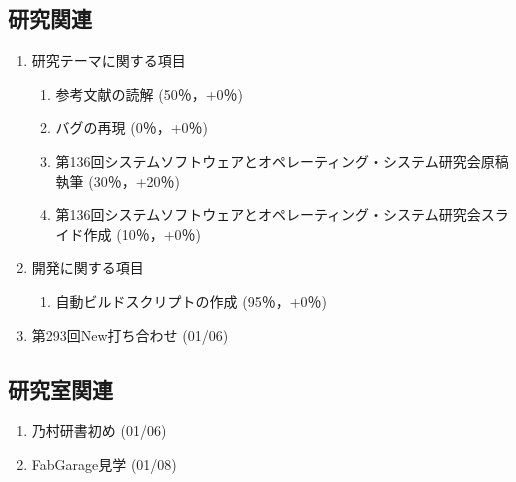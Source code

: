 \documentclass[fleqn, 14pt]{extarticle}
\begin{document}
    \subsection{研究関連}
    \label{sec-2-1}
    \begin{enumerate}

        \item 研究テーマに関する項目
            \hfill
            \label{enum-research1}
            \begin{enumerate}

                \item 参考文献の読解
                    \hfill
                    \label{enum-1-A}
                    (50％，+0％)

                \item バグの再現
                    \hfill
                    \label{enum-1-B}
                    (0％，+0％)

                \item 第136回システムソフトウェアとオペレーティング・システム研究会原稿執筆
                    \hfill
                    \label{enum-1-C}
                    (30％，+20％)

                \item 第136回システムソフトウェアとオペレーティング・システム研究会スライド作成
                    \hfill
                    \label{enum-1-D}
                    (10％，+0％)

            \end{enumerate}

        \item 開発に関する項目
            \hfill
            \label{enum-research2}
            \begin{enumerate}

                \item 自動ビルドスクリプトの作成
                    \hfill
                    \label{enum-2-A}
                    (95％，+0％)

            \end{enumerate}

        \item 第293回New打ち合わせ
            \hfill
            \label{enum-research3}
            (01/06)

    \end{enumerate}
    \subsection{研究室関連}
    \label{sec-2-2}
    \begin{enumerate}

        \item 乃村研書初め
            \hfill
            \label{enum-18}
            (01/06)

        \item FabGarage見学
            \hfill
            \label{enum-18}
            (01/08)

    \end{enumerate}
\end{document}
